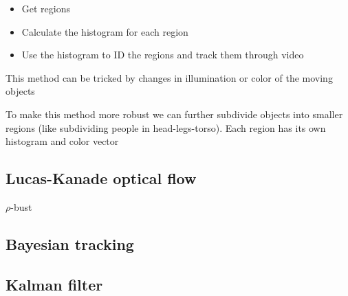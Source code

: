 \documentclass{article}
\begin{document}
\begin{itemize}
    \item Get regions
    \item Calculate the histogram for each region
    \item Use the histogram to ID the regions and track them through video
\end{itemize}
This method can be tricked by changes in illumination or color of the moving objects

To make this method more robust we can further subdivide objects into smaller regions (like subdividing people in head-legs-torso). Each region has its own histogram and color vector

\subsection{Lucas-Kanade optical flow}
$\rho$-bust

\subsection{Bayesian tracking}
\subsection{Kalman filter}
\end{document}

